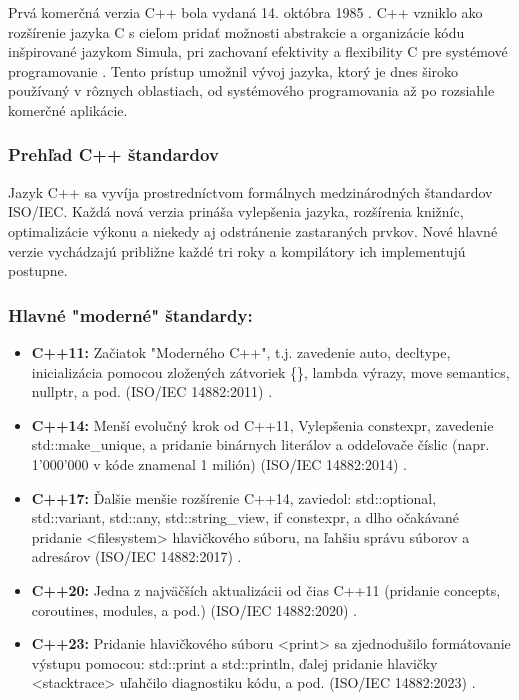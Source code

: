 \documentclass[11pt]{article}
\begin{document}
Prvá komerčná verzia C++ bola vydaná 14. októbra 1985 \cite{c++_stroustrup}. C++ vzniklo ako rozšírenie jazyka C s cieľom pridať možnosti abstrakcie a organizácie kódu inšpirované jazykom Simula, pri zachovaní efektivity a flexibility C pre systémové programovanie \cite{c++_stroustrup}. Tento prístup umožnil vývoj jazyka, ktorý je dnes široko používaný v rôznych oblastiach, od systémového programovania až po rozsiahle komerčné aplikácie.

\subsubsection{Prehľad C++ štandardov} \label{subsec:standards}

Jazyk C++ sa vyvíja prostredníctvom formálnych medzinárodných štandardov ISO/IEC. Každá nová verzia prináša vylepšenia jazyka, rozšírenia knižníc, optimalizácie výkonu a niekedy aj odstránenie zastaraných prvkov. Nové hlavné verzie vychádzajú približne každé tri roky a kompilátory ich implementujú postupne.

\subsubsection*{Hlavné "moderné" štandardy:}
\begin{itemize}
  \item \textbf{C++11:} Začiatok "Moderného C++", t.j. zavedenie auto, decltype, inicializácia pomocou zložených zátvoriek \{\}, lambda výrazy, move semantics, nullptr, a pod. (ISO/IEC 14882:2011) \cite{cppreference_c11}.
  \item \textbf{C++14:} Menší evolučný krok od C++11, Vylepšenia constexpr, zavedenie std::make\_unique, a pridanie binárnych literálov a oddeľovače číslic (napr. 1'000'000 v kóde znamenal 1 milión) (ISO/IEC 14882:2014) \cite{cppreference_c14}.
  \item \textbf{C++17:} Ďalšie menšie rozšírenie C++14, zaviedol: std::optional, std::variant, std::any, std::string\_view, if constexpr, a dlho očakávané pridanie <filesystem> hlavičkového súboru, na ľahšiu správu súborov a adresárov (ISO/IEC 14882:2017) \cite{cppreference_c17}.
  \item \textbf{C++20:} Jedna z najväčších aktualizácii od čias C++11 (pridanie concepts, coroutines, modules, a pod.) (ISO/IEC 14882:2020) \cite{cppreference_c20}.
  \item \textbf{C++23:} Pridanie hlavičkového súboru <print> sa zjednodušilo formátovanie výstupu pomocou: std::print a std::println, ďalej pridanie hlavičky <stacktrace> uľahčilo diagnostiku kódu, a pod. (ISO/IEC 14882:2023) \cite{cppreference_c23}.
\end{itemize}
\end{document}
